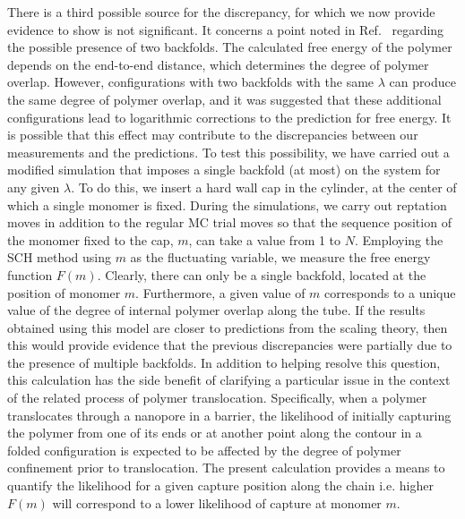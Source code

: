 \documentclass[journal=mamobx,manuscript=article,layout=twocolumn]{achemso}
\begin{document}
There is a third possible source for the discrepancy, for which we now provide evidence 
to show is not significant.  It concerns a point noted in Ref.~ 
regarding the possible presence of two backfolds. The calculated free energy
of the polymer depends on the end-to-end distance, which determines the degree
of polymer overlap. However, configurations with two backfolds with the same
$\lambda$ can produce the same degree of polymer overlap, and it was suggested
that these additional configurations lead to logarithmic corrections to the
prediction for free energy. It is possible that this effect may contribute
to the discrepancies between our measurements and the predictions. To test this
possibility, we have carried out a modified simulation that imposes a single
backfold (at most) on the system for any given $\lambda$. To do this, we
insert a hard wall cap in the cylinder, at the center of which a single monomer is fixed.
During the simulations, we carry out reptation moves in addition to the regular MC trial moves
so that the sequence position of the monomer fixed to the cap, $m$, can take
a value from 1 to $N$. Employing the SCH method using $m$ as the fluctuating
variable, we measure the free energy function $F(m)$. Clearly, there can only
be a single backfold, located at the position of monomer $m$. Furthermore, a given value 
of $m$ corresponds to a unique value of the degree of internal polymer overlap along
the tube. If the results obtained using this model are closer to predictions
from the scaling theory, then this would provide evidence that the previous discrepancies
were partially due to the presence of multiple backfolds. In addition to 
helping resolve this question, this calculation has the side benefit 
of clarifying a particular issue in the context of the related process of polymer
translocation. Specifically, when a polymer translocates through a nanopore
in a barrier, the likelihood of initially capturing the polymer from one of
its ends or at another point along the contour in a folded configuration
is expected to be affected by the degree of polymer confinement prior to
translocation. The present calculation provides a means to quantify the likelihood
for a given capture position along the chain i.e. higher $F(m)$ will correspond
to a lower likelihood of capture at monomer $m$.\cite{ding2016flow}
\end{document}
